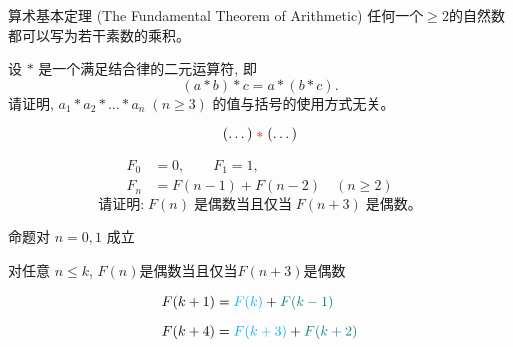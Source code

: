
\begin{frame}{}
  \begin{exampleblock}{算术基本定理 (The Fundamental Theorem of Arithmetic)}
    任何一个$\ge 2$的自然数都可以写为若干素数的乘积。
  \end{exampleblock}

  \pause
  \vspace{0.30cm}
  \begin{center}
  \end{center}
\end{frame}

\begin{frame}{}
  \begin{exampleblock}{}
    \begin{center}
      设 $\ast$ 是一个满足结合律的二元运算符, 即
      \[
        (a \ast b) \ast c = a \ast (b \ast c).
      \]
      请证明, $a_{1} \ast a_{2} \ast \dots \ast a_{n}\; (n \ge 3)$
      的值与括号的使用方式无关。
    \end{center}
  \end{exampleblock}

  \pause
  \vspace{0.30cm}
  \begin{center}
  \end{center}

  \pause
  \[
    (\dots) \;\textcolor{red}{\ast}\; (\dots)
  \]
\end{frame}

\begin{frame}{}
  \begin{exampleblock}{}
    \begin{align*}
      F_{0} &= 0, \qquad F_{1} = 1, \\[6pt]
      F_{n} &= F(n-1) + F(n-2) \quad (n \ge 2)
    \end{align*}
    \[
      \text{请证明:}\; F(n) \;\text{是偶数当且仅当}\; F(n+3) \;\text{是偶数。}
    \]
  \end{exampleblock}

  \pause
  \begin{center}

    \pause
    \vspace{0.30cm}
     命题对 $n = 0, 1$ 成立

    \pause
    \vspace{0.30cm}
     对任意 $n \le k$, $F(n)$是偶数当且仅当$F(n+3)$是偶数

    \pause
    \begin{align*}
      F(k+1) &= \textcolor{cyan}{F(k)} + \textcolor{teal}{F(k-1)} \\[6pt]
      F(k+4) &= \textcolor{cyan}{F(k+3)} + \textcolor{teal}{F(k+2)}
    \end{align*}
  \end{center}
\end{frame}

